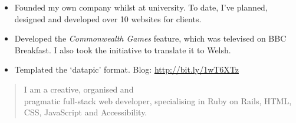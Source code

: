 \documentclass[10pt,a4paper,ragged2e,withhyper]{altacv}
\begin{document}
\begin{paracol}{2}

\begin{itemize}
    \item Founded my own company whilst at university. To date, I've planned, designed and developed over 10 websites for clients.
\end{itemize}

\divider


\begin{itemize}
    \item Developed the \emph{Commonwealth Games} feature, which was televised on BBC Breakfast. I also took the initiative to translate it to Welsh.
    \item Templated the ‘datapic’ format. Blog: \url{http://bit.ly/1wT6XTz}
\end{itemize}


\nocite{*}

\printbibliography[heading=pubtype,title={\printinfo{\faBook}{Newsletters}},type=newsletter]

\printbibliography[heading=pubtype,title={\printinfo{\faUsers}{Talks}},type=inproceedings]


\printbibliography[heading=pubtype,title={\printinfo{\faBook}{Books}},type=book]


\printbibliography[heading=pubtype,title={\printinfo{\faFile*[regular]}{Articles}}, type=misc]


\switchcolumn

\begin{quote}
I am a creative, organised and
\\
pragmatic full-stack web developer, specialising in Ruby on Rails, HTML, CSS, JavaScript and Accessibility.
\end{quote}



\divider


\end{paracol}
\end{document}
